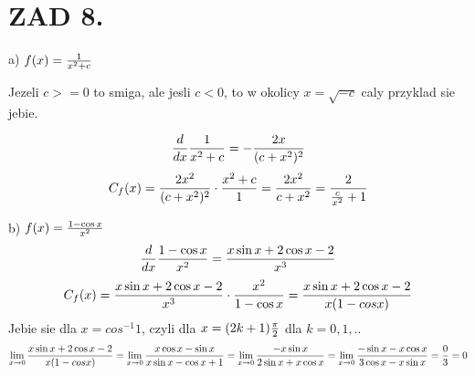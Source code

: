 \documentclass{article}[13pt]
\begin{document}
    \section*{ZAD 8.}
    a) $f(x)={1\over x^2+c}$

    Jezeli $c>=0$ to smiga, ale jesli $c<0$, to w okolicy $x=\sqrt{-c}$ caly przyklad sie jebie.

    $${d\over dx}{1\over x^2+c}=-{2x\over (c+x^2)^2}$$
    $$C_f(x)={2x^2\over (c+x^2)^2}\cdot{x^2+c\over 1}={2x^2\over c+x^2}={2\over \frac{c}{x^2}+1}$$
    \medskip

    b) $f(x)={1-\cos x\over x^2}$
    $${d\over dx}{1-\cos x\over x^2}={x\sin x+2\cos x-2\over x^3}$$
    $$C_f(x)={x\sin x+2\cos x-2\over x^3}\cdot {x^2\over 1-\cos x}={x\sin x+2\cos x-2\over x(1-cos x)}$$
    Jebie sie dla $x = cos^{-1}1$, czyli dla $x=(2k+1){\pi\over 2}$ dla $k=0,1, ..$
    $$\lim\limits_{x\to 0}{x\sin x+2\cos x-2\over x(1-cos x)}=\lim\limits_{x\to 0}{x\cos x-\sin x\over x\sin x-\cos x+1}=\lim\limits_{x\to 0}{-x\sin x\over 2\sin x+x\cos x}=\lim\limits_{x\to 0}{-\sin x-x\cos x \over 3\cos x-x\sin x}=\frac03=0$$
\end{document}

